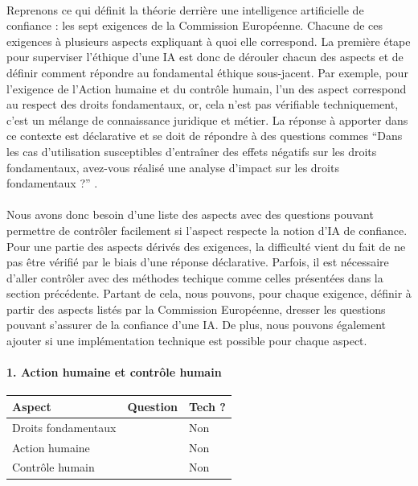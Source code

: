\documentclass[10pt, french, a4paper]{report}
\begin{document}
\paragraph{}
Reprenons ce qui définit la théorie derrière une intelligence artificielle de confiance : les sept exigences de la Commission Européenne. Chacune de ces exigences à plusieurs aspects expliquant à quoi elle correspond. La première étape pour superviser l'éthique d'une IA est donc de dérouler chacun des aspects et de définir comment répondre au fondamental éthique sous-jacent. Par exemple, pour l'exigence de l'Action humaine et du contrôle humain, l'un des aspect correspond au respect des droits fondamentaux, or, cela n'est pas vérifiable techniquement, c'est un mélange de connaissance juridique et métier. La réponse à apporter dans ce contexte est déclarative et se doit de répondre à des questions commes  ``Dans les cas d’utilisation susceptibles d’entraîner des effets négatifs sur les droits fondamentaux, avez-vous réalisé une analyse d’impact sur les droits fondamentaux ?'' \citep{commission_europeenne_ethics_2019}.

\paragraph{}
Nous avons donc besoin d'une liste des aspects avec des questions pouvant permettre de contrôler facilement si l'aspect respecte la notion d'IA de confiance. Pour une partie des aspects dérivés des exigences, la difficulté vient du fait de ne pas être vérifié par le biais d'une réponse déclarative. Parfois, il est nécessaire d'aller contrôler avec des méthodes techique comme celles présentées dans la section précédente. Partant de cela, nous pouvons, pour chaque exigence, définir à partir des aspects listés par la Commission Européenne, dresser les questions pouvant s'assurer de la confiance d'une IA. De plus, nous pouvons également ajouter si une implémentation technique est possible pour chaque aspect.

\paragraph{1. Action humaine et contrôle humain}

\begin{center}
  \begin{tabular}{ |p{4cm}|p{6cm}|p{2cm}| } 
    \hline
    Aspect & Question & Tech ? \\
    \hline
    \hline
    Droits fondamentaux &  & Non \\
    \hline
    Action humaine & & Non \\
    \hline
    Contrôle humain & & Non \\ 
    \hline
    
  \end{tabular}
\end{center}
\end{document}
